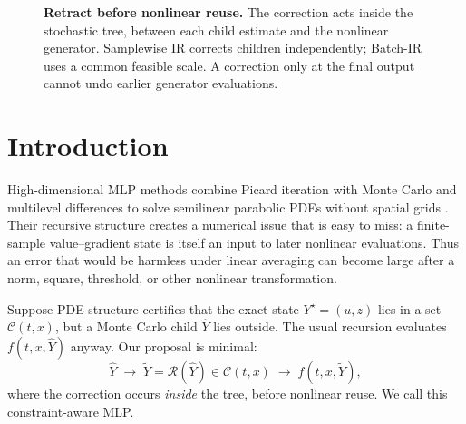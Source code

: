 \documentclass{article}
\begin{document}
\begin{figure}[!t]
\centering
{}
\caption{\textbf{Retract before nonlinear reuse.} The correction acts inside the stochastic tree, between each child estimate and the nonlinear generator. Samplewise IR corrects children independently; Batch-IR uses a common feasible scale. A correction only at the final output cannot undo earlier generator evaluations.}
\label{fig:interface}
\end{figure}

\section{Introduction}
High-dimensional MLP methods combine Picard iteration with Monte Carlo and multilevel differences to solve semilinear parabolic PDEs without spatial grids \citep{E2021,HutzenthalerKruse2020,NeufeldWu2025}. Their recursive structure creates a numerical issue that is easy to miss: a finite-sample value--gradient state is itself an input to later nonlinear evaluations. Thus an error that would be harmless under linear averaging can become large after a norm, square, threshold, or other nonlinear transformation.

Suppose PDE structure certifies that the exact state $Y^\star=(u,z)$ lies in a set $\mathcal C(t,x)$, but a Monte Carlo child $\widehat Y$ lies outside. The usual recursion evaluates $f(t,x,\widehat Y)$ anyway. Our proposal is minimal:
\begin{equation}
\widehat Y \;\longrightarrow\; \widetilde Y=\mathcal R(\widehat Y)\in\mathcal C(t,x)
\;\longrightarrow\; f(t,x,\widetilde Y),
\label{eq:principle}
\end{equation}
where the correction occurs \emph{inside} the tree, before nonlinear reuse. We call this constraint-aware MLP.
\end{document}
